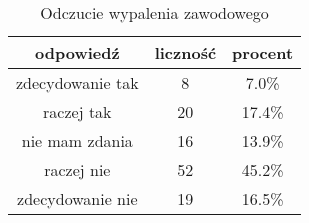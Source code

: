 \begin{table}[H]
\caption{Odczucie wypalenia zawodowego}
\centering
\begin{tabular}{ | c | c | c |}
\hline
odpowiedź & liczność & procent\\
\hline
zdecydowanie tak  &  8  & 7.0\% \\
\hline
raczej tak  &  20  & 17.4\% \\
\hline
nie mam zdania  &  16  & 13.9\% \\
\hline
raczej nie  &  52  & 45.2\% \\
\hline
zdecydowanie nie  &  19  & 16.5\% \\
\hline
\end{tabular}
\label{tab:Q35}
\end{table}
